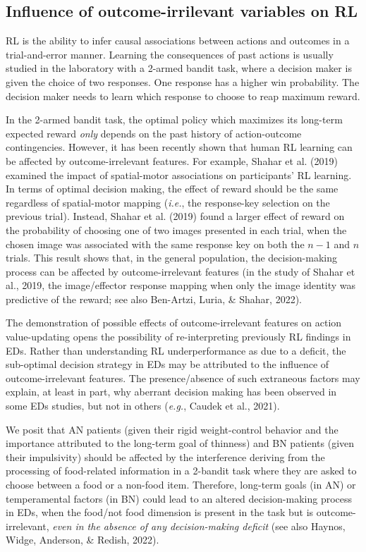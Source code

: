 \documentclass[
  man,floatsintext]{apa6}
\begin{document}
\hypertarget{influence-of-outcome-irrilevant-variables-on-rl}{%
\subsection{Influence of outcome-irrilevant variables on RL}\label{influence-of-outcome-irrilevant-variables-on-rl}}

RL is the ability to infer causal associations between actions and outcomes in a trial-and-error manner. Learning the consequences of past actions is usually studied in the laboratory with a 2-armed bandit task, where a decision maker is given the choice of two responses. One response has a higher win probability. The decision maker needs to learn which response to choose to reap maximum reward.

In the 2-armed bandit task, the optimal policy which maximizes its long-term expected reward \emph{only} depends on the past history of action-outcome contingencies. However, it has been recently shown that human RL learning can be affected by outcome-irrelevant features. For example, Shahar et al. (2019) examined the impact of spatial-motor associations on participants' RL learning. In terms of optimal decision making, the effect of reward should be the same regardless of spatial-motor mapping (\emph{i.e.}, the response-key selection on the previous trial). Instead, Shahar et al. (2019) found a larger effect of reward on the probability of choosing one of two images presented in each trial, when the chosen image was associated with the same response key on both the \(n - 1\) and \(n\) trials. This result shows that, in the general population, the decision-making process can be affected by outcome-irrelevant features (in the study of Shahar et al., 2019, the image/effector response mapping when only the image identity was predictive of the reward; see also Ben-Artzi, Luria, \& Shahar, 2022).

The demonstration of possible effects of outcome-irrelevant features on action value-updating opens the possibility of re-interpreting previously RL findings in EDs. Rather than understanding RL underperformance as due to a deficit, the sub-optimal decision strategy in EDs may be attributed to the influence of outcome-irrelevant features. The presence/absence of such extraneous factors may explain, at least in part, why aberrant decision making has been observed in some EDs studies, but not in others (\emph{e.g.}, Caudek et al., 2021).

We posit that AN patients (given their rigid weight-control behavior and the importance attributed to the long-term goal of thinness) and BN patients (given their impulsivity) should be affected by the interference deriving from the processing of food-related information in a 2-bandit task where they are asked to choose between a food or a non-food item. Therefore, long-term goals (in AN) or temperamental factors (in BN) could lead to an altered decision-making process in EDs, when the food/not food dimension is present in the task but is outcome-irrelevant, \emph{even in the absence of any decision-making deficit} (see also Haynos, Widge, Anderson, \& Redish, 2022).
\end{document}
